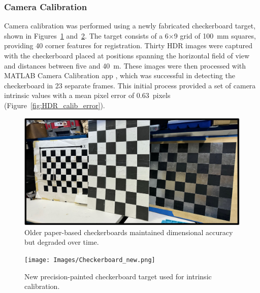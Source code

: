 \documentclass[../main.tex]{subfiles}
\begin{document}
\subsubsection{Camera Calibration} \label{sec:camera_intriniscs_results}

Camera calibration was performed using a newly fabricated checkerboard target, shown in Figures~\ref{fig:checkerboard_old} and~\ref{fig:checkerboard_new}.  
The target consists of a 6$\times$9 grid of 100~mm squares, providing 40 corner features for registration.  
Thirty HDR images were captured with the checkerboard placed at positions spanning the horizontal field of view and distances between five and 40~m.
These images were then processed with MATLAB Camera Calibration app \cite{matlab_calibration}, which was successful in detecting the checkerboard in 23 separate frames.  
This initial process provided a set of camera intrinsic values with a mean pixel error of 0.63~pixels (Figure~\ref{fig:HDR_calib_error}).

\begin{figure}[htbp]
    \centering
    \includegraphics[width=0.9\linewidth]{Images/checkerboard_old.jpg}
    \caption{Older paper-based checkerboards maintained dimensional accuracy but degraded over time.}
    \label{fig:checkerboard_old}
\end{figure}

\begin{figure}[htbp]
    \centering
    \texttt{[image: Images/Checkerboard\_new.png]}
    \caption{New precision-painted checkerboard target used for intrinsic calibration.}
    \label{fig:checkerboard_new}
\end{figure}
\end{document}
